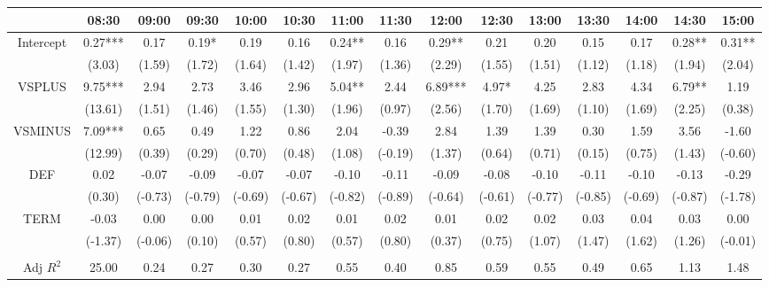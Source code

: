 \begin{table}[h]
\begin{threeparttable}
\begin{tabular}{ccccccccccccccc}
                & 08:30   & 09:00   & 09:30   & 10:00   & 10:30   & 11:00   & 11:30   & 12:00   & 12:30   & 13:00   & 13:30   & 14:00   & 14:30   & 15:00   \\ \midrule
Intercept       & 0.27*** & 0.17    & 0.19*   & 0.19    & 0.16    & 0.24**  & 0.16    & 0.29**  & 0.21    & 0.20    & 0.15    & 0.17    & 0.28**  & 0.31**  \\
                & (3.03)  & (1.59)  & (1.72)  & (1.64)  & (1.42)  & (1.97)  & (1.36)  & (2.29)  & (1.55)  & (1.51)  & (1.12)  & (1.18)  & (1.94)  & (2.04)  \\
VSPLUS          & 9.75*** & 2.94    & 2.73    & 3.46    & 2.96    & 5.04**  & 2.44    & 6.89*** & 4.97*   & 4.25    & 2.83    & 4.34    & 6.79**  & 1.19    \\
                & (13.61) & (1.51)  & (1.46)  & (1.55)  & (1.30)  & (1.96)  & (0.97)  & (2.56)  & (1.70)  & (1.69)  & (1.10)  & (1.69)  & (2.25)  & (0.38)  \\
VSMINUS         & 7.09*** & 0.65    & 0.49    & 1.22    & 0.86    & 2.04    & -0.39   & 2.84    & 1.39    & 1.39    & 0.30    & 1.59    & 3.56    & -1.60   \\
                & (12.99) & (0.39)  & (0.29)  & (0.70)  & (0.48)  & (1.08)  & (-0.19) & (1.37)  & (0.64)  & (0.71)  & (0.15)  & (0.75)  & (1.43)  & (-0.60) \\
DEF             & 0.02    & -0.07   & -0.09   & -0.07   & -0.07   & -0.10   & -0.11   & -0.09   & -0.08   & -0.10   & -0.11   & -0.10   & -0.13   & -0.29   \\
                & (0.30)  & (-0.73) & (-0.79) & (-0.69) & (-0.67) & (-0.82) & (-0.89) & (-0.64) & (-0.61) & (-0.77) & (-0.85) & (-0.69) & (-0.87) & (-1.78) \\
TERM            & -0.03   & 0.00    & 0.00    & 0.01    & 0.02    & 0.01    & 0.02    & 0.01    & 0.02    & 0.02    & 0.03    & 0.04    & 0.03    & 0.00    \\
                & (-1.37) & (-0.06) & (0.10)  & (0.57)  & (0.80)  & (0.57)  & (0.80)  & (0.37)  & (0.75)  & (1.07)  & (1.47)  & (1.62)  & (1.26)  & (-0.01) \\
                &         &         &         &         &         &         &         &         &         &         &         &         &         &         \\
Adj $R^{2}$ & 25.00   & 0.24    & 0.27    & 0.30    & 0.27    & 0.55    & 0.40    & 0.85    & 0.59    & 0.55    & 0.49    & 0.65    & 1.13    & 1.48   \\


\end{tabular}
\end{threeparttable}
\end{table}
